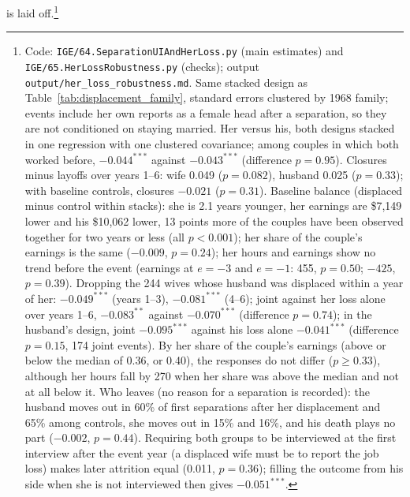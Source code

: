 is laid off.\footnote{Code: \texttt{IGE/64.SeparationUIAndHerLoss.py} (main estimates) and
\texttt{IGE/65.HerLossRobustness.py} (checks); output \texttt{output/her\_loss\_robustness.md}. Same stacked design
as Table~\ref{tab:displacement_family}, standard errors clustered by 1968 family; events include her own reports as a
female head after a separation, so they are not conditioned on staying married. Her versus his, both designs stacked
in one regression with one clustered covariance; among couples in which both worked before, $-0.044^{***}$ against
$-0.043^{***}$ (difference $p=0.95$). Closures minus layoffs over years 1--6: wife 0.049 ($p=0.082$), husband 0.025
($p=0.33$); with baseline controls, closures $-0.021$ ($p=0.31$). Baseline balance (displaced minus control within
stacks): she is 2.1 years younger, her earnings are \$7,149 lower and his \$10,062 lower, 13 points more of the
couples have been observed together for two years or less (all $p<0.001$); her share of the couple's earnings is the
same ($-0.009$, $p=0.24$); her hours and earnings show no trend before the event (earnings at $e=-3$ and $e=-1$: 455,
$p=0.50$; $-425$, $p=0.39$). Dropping the 244 wives whose husband was displaced within a year of her: $-0.049^{***}$
(years 1--3), $-0.081^{***}$ (4--6); joint against her loss alone over years 1--6, $-0.083^{**}$ against $-0.070^{***}$
(difference $p=0.74$); in the husband's design, joint $-0.095^{***}$ against his loss alone $-0.041^{***}$
(difference $p=0.15$, 174 joint events). By her share of the couple's earnings (above or below the median of 0.36, or
0.40), the responses do not differ ($p \geq 0.33$), although her hours fall by 270 when her share was above the median
and not at all below it. Who leaves (no reason for a separation is recorded): the husband moves out in 60\% of first
separations after her displacement and 65\% among controls, she moves out in 15\% and 16\%, and his death plays no part
($-0.002$, $p=0.44$). Requiring both groups to be interviewed at the first interview after the event year (a displaced
wife must be to report the job loss) makes later attrition equal (0.011, $p=0.36$); filling the outcome from his side
when she is not interviewed then gives $-0.051^{***}$.}

